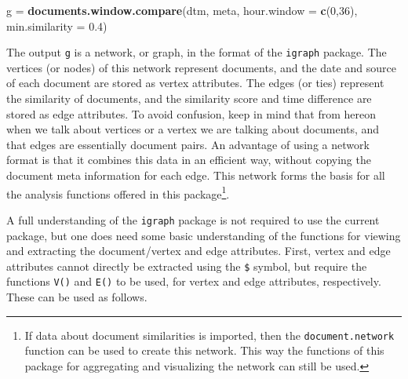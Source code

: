 \documentclass[]{article}
\newenvironment{Shaded}{\begin{snugshade}}{\end{snugshade}}
\newcommand{\KeywordTok}[1]{\textcolor[rgb]{0.13,0.29,0.53}{\textbf{{#1}}}}
\newcommand{\DataTypeTok}[1]{\textcolor[rgb]{0.13,0.29,0.53}{{#1}}}
\newcommand{\DecValTok}[1]{\textcolor[rgb]{0.00,0.00,0.81}{{#1}}}
\newcommand{\FloatTok}[1]{\textcolor[rgb]{0.00,0.00,0.81}{{#1}}}
\newcommand{\StringTok}[1]{\textcolor[rgb]{0.31,0.60,0.02}{{#1}}}
\newcommand{\NormalTok}[1]{{#1}}
\let\rmarkdownfootnote\footnote%
\def\footnote{\protect\rmarkdownfootnote}
\begin{document}
\begin{Shaded}
\begin{Highlighting}[]
\NormalTok{g =}\StringTok{ }\KeywordTok{documents.window.compare}\NormalTok{(dtm, meta,}
                             \DataTypeTok{hour.window =} \KeywordTok{c}\NormalTok{(}\DecValTok{0}\NormalTok{,}\DecValTok{36}\NormalTok{), }
                             \DataTypeTok{min.similarity =} \FloatTok{0.4}\NormalTok{)}
\end{Highlighting}
\end{Shaded}

The output \texttt{g} is a network, or graph, in the format of the
\texttt{igraph} package. The vertices (or nodes) of this network
represent documents, and the date and source of each document are stored
as vertex attributes. The edges (or ties) represent the similarity of
documents, and the similarity score and time difference are stored as
edge attributes. To avoid confusion, keep in mind that from hereon when
we talk about vertices or a vertex we are talking about documents, and
that edges are essentially document pairs. An advantage of using a
network format is that it combines this data in an efficient way,
without copying the document meta information for each edge. This
network forms the basis for all the analysis functions offered in this
package\footnote{If data about document similarities is imported, then
  the \texttt{document.network} function can be used to create this
  network. This way the functions of this package for aggregating and
  visualizing the network can still be used.}.

A full understanding of the \texttt{igraph} package is not required to
use the current package, but one does need some basic understanding of
the functions for viewing and extracting the document/vertex and edge
attributes. First, vertex and edge attributes cannot directly be
extracted using the \texttt{\$} symbol, but require the functions
\texttt{V()} and \texttt{E()} to be used, for vertex and edge
attributes, respectively. These can be used as follows.

\begin{Shaded}
\end{Shaded}
\end{document}
